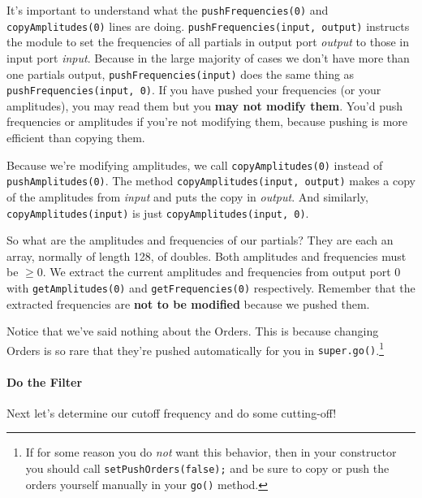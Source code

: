 \documentclass{article}
\begin{document}
It's important to understand what the {\tt pushFrequencies(0)} and {\tt copyAmplitudes(0)} lines are doing.  {\tt pushFrequencies(input, output)} instructs the module to set the frequencies of all partials in output port {\it output} to those in input port {\it input}.  Because in the large majority of cases we don't have more than one partials output,   {\tt pushFrequencies(input)} does the same thing as  {\tt pushFrequencies(input, 0)}.  If you have pushed your frequencies (or your amplitudes), you may read them but you {\bf may not modify them}.  You'd push frequencies or amplitudes if you're not modifying them, because pushing is more efficient than copying them.

Because we're modifying amplitudes, we call {\tt copyAmplitudes(0)} instead of {\tt pushAmplitudes(0)}.  The method {\tt copyAmplitudes(input, output)} makes a copy of the amplitudes from {\it input} and puts the copy in {\it output}.  And similarly, {\tt copyAmplitudes(input)} is just {\tt copyAmplitudes(input, 0)}.

So what are the amplitudes and frequencies of our partials? They are each an array, normally of length 128, of doubles.  Both amplitudes and frequencies must be \(\geq 0\).  We extract the current amplitudes and frequencies from output port 0 with {\tt getAmplitudes(0)} and {\tt getFrequencies(0)} respectively.  Remember that the extracted frequencies are {\bf not to be modified} because we pushed them.

Notice that we've said nothing about the Orders.  This is because changing Orders is so rare that they're pushed automatically for you in {\tt super.go()}.\footnote{If for some reason you do {\it not} want this behavior, then in your constructor you should call {\tt setPushOrders(false);} and be sure to copy or push the orders yourself manually in your {\tt go()} method.}

\paragraph{Do the Filter} 
Next let's determine our cutoff frequency and do some cutting-off!
\end{document}
